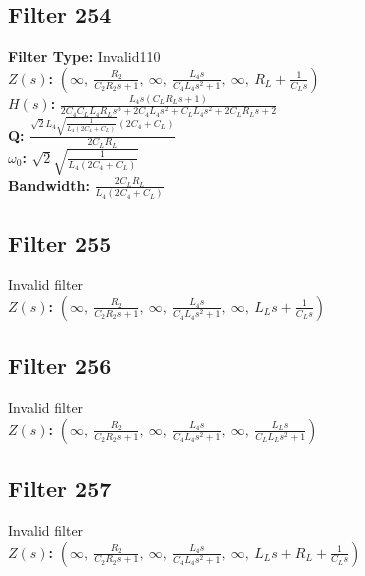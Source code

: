\documentclass{article}
\begin{document}
\subsection*{Filter 254}
\textbf{Filter Type:} Invalid110 \\ 
\textbf{$Z(s)$:} $\left( \infty, \  \frac{R_{2}}{C_{2} R_{2} s + 1}, \  \infty, \  \frac{L_{4} s}{C_{4} L_{4} s^{2} + 1}, \  \infty, \  R_{L} + \frac{1}{C_{L} s}\right)$ \\ 
\textbf{$H(s)$:} $\frac{L_{4} s \left(C_{L} R_{L} s + 1\right)}{2 C_{4} C_{L} L_{4} R_{L} s^{3} + 2 C_{4} L_{4} s^{2} + C_{L} L_{4} s^{2} + 2 C_{L} R_{L} s + 2}$ \\ 
\textbf{Q:} $\frac{\sqrt{2} L_{4} \sqrt{\frac{1}{L_{4} \left(2 C_{4} + C_{L}\right)}} \left(2 C_{4} + C_{L}\right)}{2 C_{L} R_{L}}$ \\ 
\textbf{$\omega_0$:} $\sqrt{2} \sqrt{\frac{1}{L_{4} \left(2 C_{4} + C_{L}\right)}}$ \\ 
\textbf{Bandwidth:} $\frac{2 C_{L} R_{L}}{L_{4} \left(2 C_{4} + C_{L}\right)}$ \\ 
\subsection*{Filter 255}
Invalid filter \\ 
\textbf{$Z(s)$:} $\left( \infty, \  \frac{R_{2}}{C_{2} R_{2} s + 1}, \  \infty, \  \frac{L_{4} s}{C_{4} L_{4} s^{2} + 1}, \  \infty, \  L_{L} s + \frac{1}{C_{L} s}\right)$ \\ 
\subsection*{Filter 256}
Invalid filter \\ 
\textbf{$Z(s)$:} $\left( \infty, \  \frac{R_{2}}{C_{2} R_{2} s + 1}, \  \infty, \  \frac{L_{4} s}{C_{4} L_{4} s^{2} + 1}, \  \infty, \  \frac{L_{L} s}{C_{L} L_{L} s^{2} + 1}\right)$ \\ 
\subsection*{Filter 257}
Invalid filter \\ 
\textbf{$Z(s)$:} $\left( \infty, \  \frac{R_{2}}{C_{2} R_{2} s + 1}, \  \infty, \  \frac{L_{4} s}{C_{4} L_{4} s^{2} + 1}, \  \infty, \  L_{L} s + R_{L} + \frac{1}{C_{L} s}\right)$ \\ 
\end{document}
